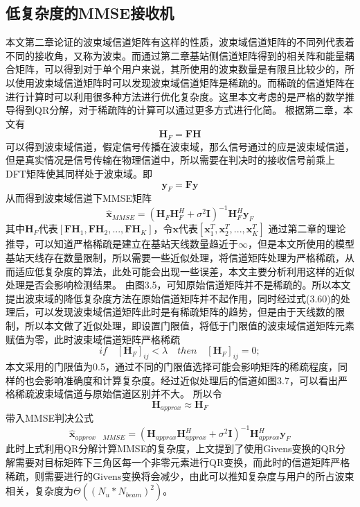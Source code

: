 \documentclass[bachelor,nocolorlinks, printoneside]{seuthesis} %
\begin{document}
\begin{Main}
\section{低复杂度的MMSE接收机}
本文第二章论证的波束域信道矩阵有这样的性质，波束域信道矩阵的不同列代表着不同的接收角，又称为波束。而通过第二章基站侧信道矩阵得到的相关阵和能量耦合矩阵，可以得到对于单个用户来说，其所使用的波束数量是有限且比较少的，所以使用波束域信道矩阵时可以发现波束域信道矩阵是稀疏的。而稀疏的信道矩阵在进行计算时可以利用很多种方法进行优化复杂度。这里本文考虑的是严格的数学推导得到QR分解，对于稀疏阵的计算可以通过更多方式进行化简。
根据第二章，本文有
\begin{equation}\label{key}
\mathbf{H}_{F} = \mathbf{F} \mathbf{H}
\end{equation}
可以得到波束域信道，假定信号传播在波束域，那么信号通过的应是波束域信道，但是真实情况是信号传输在物理信道中，所以需要在判决时的接收信号前乘上DFT矩阵使其同样处于波束域。即
\begin{equation}\label{key}
\mathbf{y}_F =\mathbf{F} \mathbf{y}
\end{equation}
从而得到波束域信道下MMSE矩阵
\begin{equation}\label{key}
\hat{\mathbf{x}}_{MMSE} = (\mathbf{H}_F\mathbf{H}_F^H + \sigma^2 \mathbf{I})^{-1}\mathbf{H}_F^H \mathbf{y}_F
\end{equation}
其中$\mathbf{H}_F$代表$[\mathbf{F}\mathbf{H}_1,\mathbf{F}\mathbf{H}_2,...,\mathbf{F}\mathbf{H}_K]$，令$\mathbf{x}$代表$[\mathbf{x}_1^T,\mathbf{x}_2^T,...,\mathbf{x}_K^T]$
通过第二章的理论推导，可以知道严格稀疏是建立在基站天线数量趋近于$\infty$，但是本文所使用的模型基站天线存在数量限制，所以需要一些近似处理，将信道矩阵处理为严格稀疏，从而适应低复杂度的算法，此处可能会出现一些误差，本文主要分析利用这样的近似处理是否会影响检测结果。
由图3.5，可知原始信道矩阵并不是稀疏的。所以本文提出波束域的降低复杂度方法在原始信道矩阵并不起作用，同时经过式(3.60)的处理后，可以发现波束域信道矩阵此时是有稀疏矩阵的趋势，但是由于天线数的限制，所以本文做了近似处理，即设置门限值，将低于门限值的波束域信道矩阵元素赋值为零，此时波束域信道矩阵严格稀疏
\begin{equation}\label{key}
if\quad [\mathbf{H}_F]_{ij} <\lambda \quad then \quad [\mathbf{H}_F]_{ij}=0;
\end{equation}
本文采用的门限值为0.5，通过不同的门限值选择可能会影响矩阵的稀疏程度，同样的也会影响准确度和计算复杂度。经过近似处理后的信道如图3.7，可以看出严格稀疏波束域信道与原始信道区别并不大。
所以令
\begin{equation}\label{key}
\mathbf{H}_{approx} \approx \mathbf{H}_F
\end{equation}
带入MMSE判决公式
\begin{equation}\label{key}
\hat{\mathbf{x}}_{approx\quad MMSE} = (\mathbf{H}_{approx}\mathbf{H}_{approx}^H + \sigma^2 \mathbf{I})^{-1}\mathbf{H}_{approx}^H \mathbf{y}_F
\end{equation}
此时上式利用QR分解计算MMSE的复杂度，上文提到了使用Givens变换的QR分解需要对目标矩阵下三角区每一个非零元素进行QR变换，而此时的信道矩阵严格稀疏，则需要进行的Givens变换将会减少，由此可以推知复杂度与用户的所占波束相关，复杂度为$\Theta((N_u*N_{beam})^2)$。


\end{Main}
\end{document}
